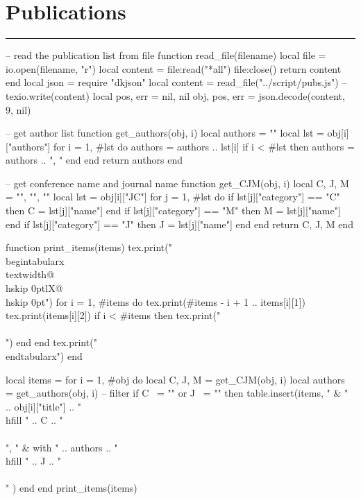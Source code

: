 \documentclass{article}
\begin{document}
\section*{Publications}
\vspace{-1em} \hrule \vspace{1em}

\begin{luacode}
  -- read the publication list from file
  function read_file(filename)
    local file = io.open(filename, "r")
    local content = file:read("*all")
    file:close()
    return content
  end
  local json = require "dkjson"
  local content = read_file("../script/pubs.js")
  -- texio.write(content)
  local pos, err = nil, nil
  obj, pos, err = json.decode(content, 9, nil)
\end{luacode}


\begin{luacode}
  -- get author list
  function get_authors(obj, i) 
    local authors = ""
    local lst = obj[i]["authors"]
    for i = 1, #lst do
      authors = authors .. lst[i]
      if i < #lst then
        authors = authors .. ", "
      end
    end
    return authors
  end

  -- get conference name and journal name
  function get_CJM(obj, i)
    local C, J, M = "", "", "" 
    local lst = obj[i]["JC"]
    for j = 1, #lst do
      if lst[j]["category"] == "C" then
        C = lst[j]["name"]
      end
      if lst[j]["category"] == "M" then
        M = lst[j]["name"]
      end
      if lst[j]["category"] == "J" then
        J = lst[j]["name"]
      end
    end
    return C, J, M
  end

  function print_items(items)
    tex.print("\\begin{tabularx}{\\textwidth}{@{\\hskip 0pt}lX@{\\hskip 0pt}}")
    for i = 1, #items do
      tex.print(#items - i + 1 .. items[i][1])
      tex.print(items[i][2])
      if i < #items then
        tex.print("\\\\")
      end
    end
    tex.print("\\end{tabularx}")
  end
\end{luacode}

\begin{luacode}
  local items = {}
  for i = 1, #obj do
    local C, J, M = get_CJM(obj, i)
    local authors = get_authors(obj, i)
    -- filter
    if C ~= "" or J ~= "" then
      table.insert(items, {
        " & " .. obj[i]["title"] .. " \\hfill " .. C .. "\\\\",
        " & with " .. authors .. " \\hfill " .. J .. "\\\\"
      })
    end
  end
  print_items(items)
\end{luacode}
\end{document}
